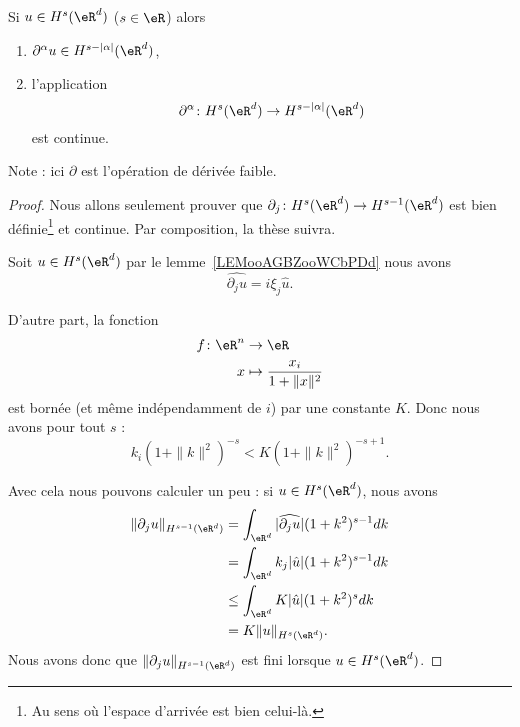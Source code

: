 \begin{proposition}
	Si \( u\in H^s(\eR^d)\) (\( s\in \eR\)) alors
	\begin{enumerate}
		\item
		      \( \partial^{\alpha}u\in H^{s-| \alpha |}(\eR^d)\),
		\item
		      l'application
		      \begin{equation}
			      \partial^{\alpha}\colon H^s(\eR^d)\to H^{s-| \alpha |}(\eR^d)
		      \end{equation}
		      est continue.
	\end{enumerate}
\end{proposition}
Note : ici \( \partial\) est l'opération de dérivée faible.

\begin{proof}
	Nous allons seulement prouver que \( \partial_j\colon H^s(\eR^d)\to  H^{s-1}(\eR^d) \) est bien définie\footnote{Au sens où l'espace d'arrivée est bien celui-là.} et continue. Par composition, la thèse suivra.

	Soit \( u\in H^s(\eR^d)\) par le lemme~\ref{LEMooAGBZooWCbPDd} nous avons
	\begin{equation}
		\widehat{\partial_ju}=i\xi_j\hat u.
	\end{equation}

	D'autre part, la fonction
	\begin{equation}
		\begin{aligned}
			f\colon \eR^n & \to \eR                             \\
			x             & \mapsto \frac{ x_i }{ 1+\| x \|^2 }
		\end{aligned}
	\end{equation}
	est bornée (et même indépendamment de \( i\)) par une constante \( K\). Donc nous avons pour tout \( s\) :
	\begin{equation}
		k_i(1+\| k \|^2)^{-s}<K(1+\| k \|^2)^{-s+1}.
	\end{equation}

	Avec cela nous pouvons calculer un peu : si \( u\in H^s(\eR^d)\), nous avons
	\begin{subequations}
		\begin{align}
			\| \partial_ju \|_{H^{s-1}(\eR^d)} & =\int_{\eR^d}| \widehat{\partial_ju} |(1+k^2)^{s-1}dk \\
			                                   & =\int_{\eR^d}k_j| \hat u |(1+k^2)^{s-1}dk             \\
			                                   & \leq \int_{\eR^d}K| \hat u |(1+k^2)^sdk               \\
			                                   & =K\| u \|_{H^s(\eR^d)}.
		\end{align}
	\end{subequations}
	Nous avons donc que \( \| \partial_ju \|_{H^{s-1}(\eR^d)}\) est fini lorsque \( u\in H^s(\eR^d)\).


\end{proof}
